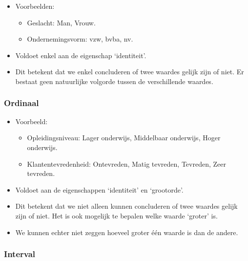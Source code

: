\documentclass[]{tufte-book}
\providecommand{\tightlist}{%
  \setlength{\itemsep}{0pt}\setlength{\parskip}{0pt}}
\begin{document}
\begin{itemize}
\tightlist
\item
  Voorbeelden:

  \begin{itemize}
  \tightlist
  \item
    Geslacht: Man, Vrouw.
  \item
    Ondernemingsvorm: vzw, bvba, nv.
  \end{itemize}
\item
  Voldoet enkel aan de eigenschap `identiteit'.
\item
  Dit betekent dat we enkel concluderen of twee waardes gelijk zijn of niet. Er bestaat geen natuurlijke volgorde tussen de verschillende waardes.
\end{itemize}

\hypertarget{ordinaal}{%
\subsubsection*{Ordinaal}\label{ordinaal}}

\begin{itemize}
\tightlist
\item
  Voorbeeld:

  \begin{itemize}
  \tightlist
  \item
    Opleidingsniveau: Lager onderwijs, Middelbaar onderwijs, Hoger onderwijs.
  \item
    Klantentevredenheid: Ontevreden, Matig tevreden, Tevreden, Zeer tevreden.
  \end{itemize}
\item
  Voldoet aan de eigenschappen `identiteit' en `grootorde'.
\item
  Dit betekent dat we niet alleen kunnen concluderen of twee waardes gelijk zijn of niet. Het is ook mogelijk te bepalen welke waarde `groter' is.
\item
  We kunnen echter niet zeggen hoeveel groter één waarde is dan de andere.
\end{itemize}

\hypertarget{interval}{%
\subsubsection*{Interval}\label{interval}}
\end{document}
